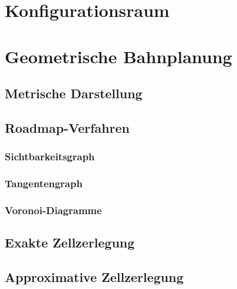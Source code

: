 \documentclass[a4paper, 11pt, accentcolor = tud3b]{tudreport}
\begin{document}
		\section{Konfigurationsraum} %

		\section{Geometrische Bahnplanung} %

			\subsection{Metrische Darstellung} %

			\subsection{Roadmap-Verfahren} %

				\subsubsection{Sichtbarkeitsgraph} %

				\subsubsection{Tangentengraph} %

				\subsubsection{Voronoi-Diagramme} %

			\subsection{Exakte Zellzerlegung} %

			\subsection{Approximative Zellzerlegung} %
\end{document}
